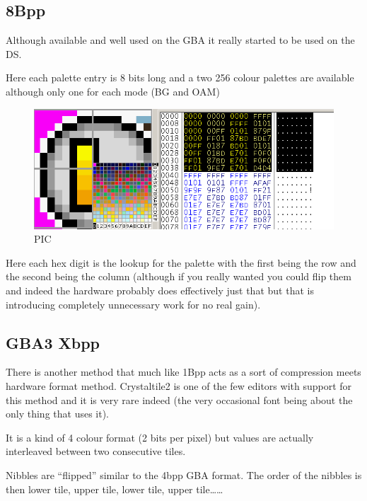 \documentclass[
]{book}
\begin{document}
\hypertarget{bpp-2}{%
\subsection{8Bpp}\label{bpp-2}}

Although available and well used on the GBA it really started to be used on the DS.

Here each palette entry is 8 bits long and a two 256 colour palettes are available although only one for each mode (BG and OAM)

\begin{figure}
\centering
\includegraphics{images/22_home_fast6191_romhackingguide_unrenamed_file___inal_borders_romhackingguide8bpppalettedemo.png}
\caption{PIC}
\end{figure}

Here each hex digit is the lookup for the palette with the first being the row and the second being the column (although if you really wanted you could flip them and indeed the hardware probably does effectively just that but that is introducing completely unnecessary work for no real gain).

\hypertarget{gba3-xbpp}{%
\subsection{GBA3 Xbpp}\label{gba3-xbpp}}

There is another method that much like 1Bpp acts as a sort of compression meets hardware format method. Crystaltile2 is one of the few editors with support for this method and it is very rare indeed (the very occasional font being about the only thing that uses it).

It is a kind of 4 colour format (2 bits per pixel) but values are actually interleaved between two consecutive tiles.

Nibbles are ``flipped'' similar to the 4bpp GBA format. The order of the nibbles is then lower tile, upper tile, lower tile, upper tile\ldots\ldots{}
\end{document}
